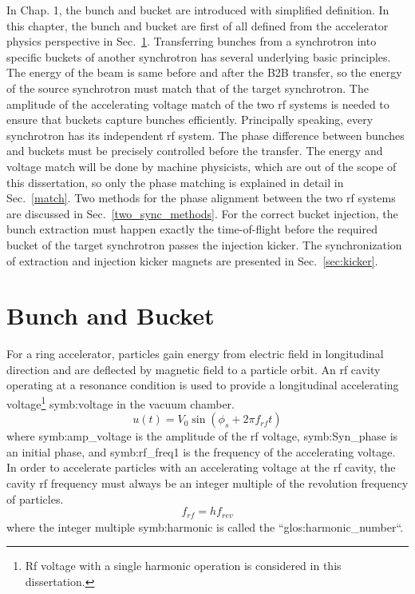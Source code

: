 In Chap. 1, the bunch and bucket are introduced with simplified definition. In this chapter, the bunch and bucket are first of all defined from the accelerator physics perspective in Sec.~\ref{bunch and bucket}. Transferring bunches from a synchrotron into specific buckets of another synchrotron has several underlying basic principles. The energy of the beam is same before and after the B2B transfer, so the energy of the source synchrotron must match that of the target synchrotron. The amplitude of the accelerating voltage match of the two rf systems is needed to ensure that buckets capture bunches efficiently. Principally speaking, every synchrotron has its independent rf system. The phase difference between bunches and buckets must be precisely controlled before the transfer. The energy and voltage match will be done by machine physicists, which are out of the scope of this dissertation, so only the phase matching is explained in detail in Sec.~\ref{match}. Two methods for the phase alignment between the two rf systems are discussed in Sec.~\ref{two_sync_methods}. For the correct bucket injection, the bunch extraction must happen exactly the time-of-flight before the required bucket of the target synchrotron passes the injection kicker. The synchronization of extraction and injection kicker magnets are presented in Sec.~\ref{sec:kicker}.

\section{Bunch and Bucket}
\label{bunch and bucket}
For a ring accelerator, particles gain energy from electric field in longitudinal direction and are deflected by magnetic field to a particle orbit. An rf cavity operating at a resonance condition is used to provide a longitudinal accelerating voltage\footnote{Rf voltage with a single harmonic operation is considered in this dissertation.} \gls{symb:voltage} in the vacuum chamber.
\begin{equation}
u(t)=V_0\sin(\phi_\mathit{s}+2\pi f_\mathit{rf}t)
\end{equation}
where \gls{symb:amp_voltage} is the amplitude of the rf voltage, \gls{symb:Syn_phase} is an initial phase, and \gls{symb:rf_freq1} is the frequency of the accelerating voltage. In order to accelerate particles with an accelerating voltage at the rf cavity, the cavity rf frequency must always be an integer multiple of the revolution frequency of particles. 
\begin{equation}
	f_{\mathit{rf}}=hf_{\mathit{rev}}\label{harmonic_number}
\end{equation}
where the integer multiple \gls{symb:harmonic} is called the ``\gls{glos:harmonic_number}``. 

